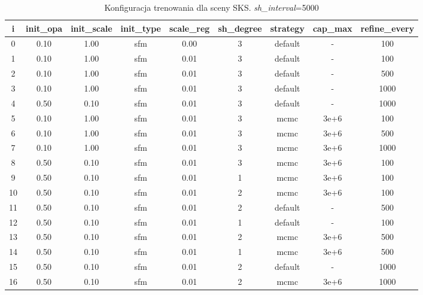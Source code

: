 \begin{table}[!h]
    \centering
    \begin{tabular}{|c|c|c|c|c|c|c|c|c|}
    \hline
    i & init\_opa & init\_scale & init\_type & scale\_reg & sh\_degree & strategy & cap\_max & refine\_every \\
    \hline
    0 & 0.10 & 1.00 & sfm & 0.00 & 3  & default & - & 100 \\
    \hline
    1 & 0.10 & 1.00 & sfm & 0.01 & 3 & default & - & 100 \\
    \hline
    2 & 0.10 & 1.00 & sfm & 0.01 & 3 & default & - & 500 \\
    \hline
    3 & 0.10 & 1.00 & sfm & 0.01 & 3 & default & - & 1000 \\
    \hline
    4 & 0.50 & 0.10 & sfm & 0.01 & 3 & default & - & 1000 \\
    \hline
    5 & 0.10 & 1.00 & sfm & 0.01 & 3 & mcmc & 3e+6 & 100 \\
    \hline
    6 & 0.10 & 1.00 & sfm & 0.01 & 3 & mcmc & 3e+6 & 500 \\
    \hline
    7 & 0.10 & 1.00 & sfm & 0.01 & 3 & mcmc & 3e+6 & 1000 \\
    \hline
    8 & 0.50 & 0.10 & sfm & 0.01 & 3 & mcmc & 3e+6 & 100 \\
    \hline
    9 & 0.50 & 0.10 & sfm & 0.01 & 1 & mcmc & 3e+6 & 100 \\
    \hline
    10 & 0.50 & 0.10 & sfm & 0.01 & 2 & mcmc & 3e+6 & 100 \\
    \hline
    11 & 0.50 & 0.10 & sfm & 0.01 & 2 & default & - & 500 \\
    \hline
    12 & 0.50 & 0.10 & sfm & 0.01 & 1 & default & - & 100 \\
    \hline
    13 & 0.50 & 0.10 & sfm & 0.01 & 2 & mcmc & 3e+6 & 500 \\
    \hline
    14 & 0.50 & 0.10 & sfm & 0.01 & 1 & mcmc & 3e+6 & 500 \\
    \hline
    15 & 0.50 & 0.10 & sfm & 0.01 & 2 & default & - & 1000 \\  
    \hline
    16 & 0.50 & 0.10 & sfm & 0.01 & 2 & mcmc & 3e+6 & 1000 \\
    \hline
    \end{tabular}
    \caption{Konfiguracja trenowania dla sceny SKS. \textit{sh\_interval}=5000}
    \label{table:tab_conf_sks}
\end{table}


